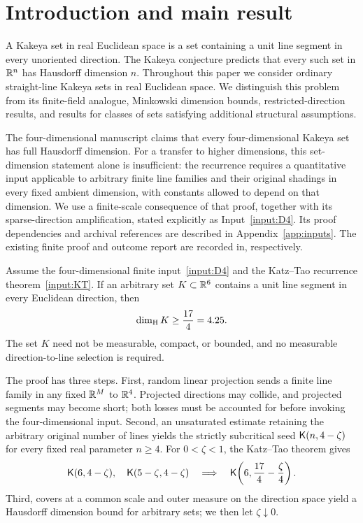 \section{Introduction and main result}
\label{sec:introduction}

A Kakeya set in real Euclidean space is a set containing a unit line segment in every unoriented direction.
The Kakeya conjecture predicts that every such set in $\mathbb R^n$ has Hausdorff dimension $n$.
Throughout this paper we consider ordinary straight-line Kakeya sets in real Euclidean space.
We distinguish this problem from its finite-field analogue, Minkowski dimension bounds,
restricted-direction results, and results for classes of sets satisfying additional structural assumptions.

The four-dimensional manuscript\cite{OAI4} claims that every four-dimensional Kakeya set has full Hausdorff dimension.
For a transfer to higher dimensions, this set-dimension statement alone is insufficient:
the recurrence requires a quantitative input applicable to arbitrary finite line families and their original shadings
in every fixed ambient dimension, with constants allowed to depend on that dimension.
We use a finite-scale consequence of that proof, together with its sparse-direction amplification,
stated explicitly as Input~\ref{input:D4}.
Its proof dependencies and archival references are described in Appendix~\ref{app:inputs}.
The existing finite proof and outcome report are recorded in\cite{ArchiveFSD,ArchiveDIM}, respectively.

\begin{theorem}\label{thm:main}
Assume the four-dimensional finite input~\ref{input:D4} and the Katz--Tao recurrence theorem~\ref{input:KT}.
If an arbitrary set $K\subset\mathbb R^6$ contains a unit line segment in every Euclidean direction, then
\begin{equation}\label{eq:main}
  \operatorname{dim}_{\mathrm H} K\ge\frac{17}{4}=4.25.
\end{equation}
The set $K$ need not be measurable, compact, or bounded, and no measurable direction-to-line selection is required.
\end{theorem}

The proof has three steps. First, random linear projection sends a finite line family in any fixed $\mathbb R^M$ to $\mathbb R^4$.
Projected directions may collide, and projected segments may become short; both losses must be accounted for before invoking the four-dimensional input.
Second, an unsaturated estimate retaining the arbitrary original number of lines yields the strictly subcritical seed
$\mathsf K(n,4-\zeta)$ for every fixed real parameter $n\ge4$.
For $0<\zeta<1$, the Katz--Tao theorem gives
\begin{equation}\label{eq:roadmap-recurrence}
  \mathsf K(6,4-\zeta),\quad\mathsf K(5-\zeta,4-\zeta)
  \quad\Longrightarrow\quad
  \mathsf K\!\left(6,\frac{17}{4}-\frac{\zeta}{4}\right).
\end{equation}
Third, covers at a common scale and outer measure on the direction space yield a Hausdorff dimension bound for arbitrary sets; we then let $\zeta\downarrow0$.

